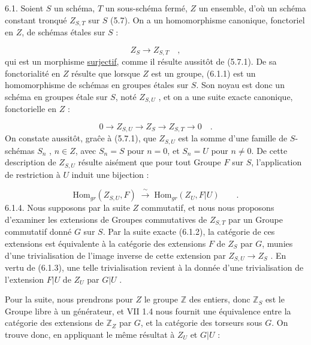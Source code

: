 6.1. Soient $S$ un schéma, $T$ un sous-schéma fermé, $Z$ un ensemble, d'où un schéma constant tronqué $Z_{S,T}$ sur $S$ (5.7). On a un homomorphisme canonique, fonctoriel en $Z$, de schémas étales sur $S$ :

\begin{equation}\tag{6.1.1}
Z_S \longrightarrow Z_{S,T} \quad ,
\end{equation}
qui est un morphisme \underline{surjectif}, comme il résulte aussitôt de (5.7.1). De sa fonctorialité en $Z$ résulte que lorsque $Z$ est un groupe, (6.1.1) est un homomorphisme de schémas en groupes étales sur $S$. Son noyau est donc un schéma en groupes étale sur $S$, noté $Z_{S,U}$ , et on a une suite exacte canonique, fonctorielle en $Z$ :

\begin{equation}\tag{6.1.2}
0 \longrightarrow Z_{S,U} \longrightarrow Z_S \longrightarrow Z_{S,T} \longrightarrow 0 \quad .
\end{equation}
On constate aussitôt, gra\^{c}e à (5.7.1), que $Z_{S,U}$ est la somme d'une famille de $S$-schémas $S_n$ , $n \in Z$, avec $S_n = S$ pour $n = 0$, et $S_n = U$ pour $n \neq 0$. De cette description de $Z_{S,U}$ résulte aisément que pour tout
Groupe $F$ sur $S$, l'application de restriction à $U$ induit une bijection :

\begin{equation}\tag{6.1.3}
\mathrm{Hom}_{gr}(Z_{S,U},F) \;\xrightarrow{\,\sim\,}\; \mathrm{Hom}_{gr}(Z_U,F|U) \qquad .
\end{equation}
6.1.4. Nous supposons par la suite $Z$ commutatif, et nous nous proposons d'examiner les extensions de Groupes commutatives de $Z_{S,T}$ par un Groupe commutatif donné $G$ sur $S$. Par la suite exacte (6.1.2), la catégorie de ces extensions est équivalente à la catégorie des extensions $F$ de $Z_S$ par $G$, munies d'une trivialisation de l'image inverse de cette extension par $Z_{S,U} \longrightarrow Z_S$ . En vertu de (6.1.3), une telle trivialisation revient à la donnée d'une trivialisation de l'extension $F|U$ de $Z_U$ par $G|U$ .

Pour la suite, nous prendrons pour $Z$ le groupe $\mathbb{Z}$ des entiers, donc $\mathbb{Z}_S$ est le Groupe libre à un générateur, et VII 1.4 nous fournit une équivalence entre la catégorie des extensions de $\mathbb{Z}_Z$ par $G$, et la catégorie des torseurs sous $G$. On trouve donc, en appliquant le même résultat à $Z_U$ et $G|U$ :

